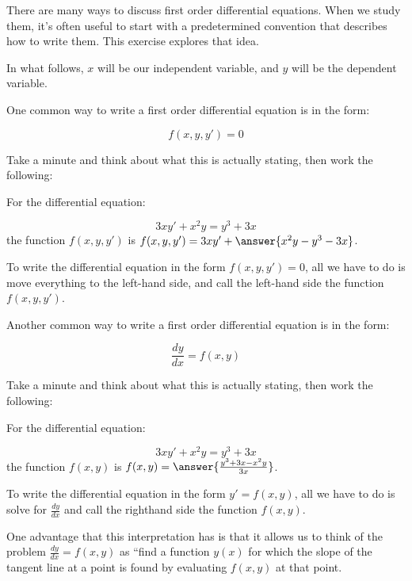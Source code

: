 \documentclass{ximera}
\author{Jim Talamo}
\begin{document}
\begin{exercise}

There are many ways to discuss first order differential equations.  When we study them, it's often useful to start with a predetermined convention that describes how to write them.  This exercise explores that idea.

In what follows, $x$ will be our independent variable, and $y$ will be the dependent variable.

\begin{exercise}
One common way to write a first order differential equation is in the form:

\[f(x,y,y')= 0 \]

Take a minute and think about what this is actually stating, then work the following:

For the differential equation:

\[
3xy'+x^2y=y^3+3x
\]
the function $f(x,y,y')$ is $f(x,y,y') = 3xy'+\answer{x^2y-y^3-3x}$.

\begin{hint}
To write the differential equation in the form $f(x,y,y')= 0$, all we have to do is move everything to the left-hand side, and call the left-hand side the function $f(x,y,y')$.
\end{hint}
\end{exercise}

\begin{exercise}
Another common way to write a first order differential equation is in the form:

\[\frac{dy}{dx}= f(x,y) \]

Take a minute and think about what this is actually stating, then work the following:

For the differential equation:

\[
3xy'+x^2y=y^3+3x
\]
the function $f(x,y)$ is $f(x,y) = \answer{\frac{y^3+3x-x^2y}{3x}}$.

\begin{hint}
To write the differential equation in the form $y' = f(x,y)$, all we have to do is solve for $\frac{dy}{dx}$ and call the righthand side the function $f(x,y)$.
\end{hint}

One advantage that this interpretation has is that it allows us to think of the problem $\frac{dy}{dx}= f(x,y)$ as ``find a function $y(x)$ for which the slope of the tangent line at a point is found by evaluating $f(x,y)$ at that point.


\end{exercise}
\end{exercise}
\end{document}

